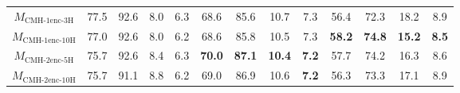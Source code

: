 \begin{table}[t]
{\begin{adjustbox}{width=1.3\textwidth,center}
\begin{tabular}{|c|cccc|cccc|cccc|}
        $M_{\text{CMH-}1\text{enc-}3\text{H}}$                      & 77.5                         & 92.6                         & 8.0           & 6.3         & 68.6                         & 85.6                         & 10.7          & 7.3          & 56.4                         & 72.3                         & 18.2          & 8.9           \\
        $M_{\text{CMH-}1\text{enc-}10\text{H}}$                     & 77.0                         & 92.6                         & 8.0           & 6.2          & 68.6                         & 85.8                         & 10.5          & 7.3          & \textbf{58.2}                         & \textbf{74.8}                         & \textbf{15.2}          & \textbf{8.5}         \\
        $M_{\text{CMH-}2\text{enc-}5\text{H}}$                      & 75.7                         & 92.6                         & 8.4           & 6.3          & \textbf{70.0}                         & \textbf{87.1}                         & \textbf{10.4}          & \textbf{7.2}         & 57.7                         & 74.2                         & 16.3          & 8.6          \\
        $M_{\text{CMH-}2\text{enc-}10\text{H}}$                     & 75.7                         & 91.1                         & 8.8           & 6.2          & 69.0                         & 86.9                         & 10.6          & \textbf{7.2}           & 56.3                         & 73.3                         & 17.1          & 8.9          \\ \hline
        \end{tabular}
    \end{adjustbox}
    }


\end{table}
